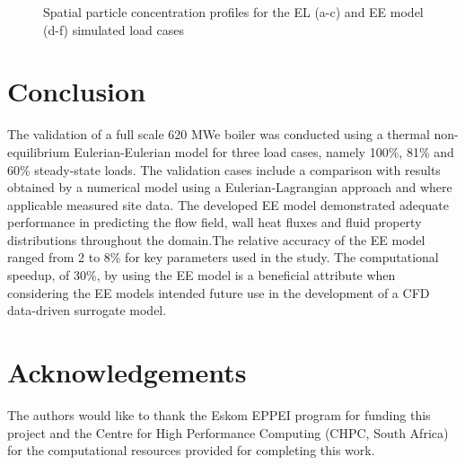 \documentclass{webofc}
\begin{document}
\begin{figure}[h!]
\setlength{\belowcaptionskip}{0pt} 
\caption{Spatial particle concentration profiles for the EL (a-c) and EE model (d-f) simulated load cases}
\label{fig_concentration}
\end{figure}

\clearpage
\section{Conclusion}
The validation of a full scale 620 MWe boiler was conducted using a thermal non-equilibrium Eulerian-Eulerian model for three load cases, namely 100\%, 81\% and 60\% steady-state loads. The validation cases include a comparison with results obtained by a numerical model using a Eulerian-Lagrangian approach and where applicable measured site data. The developed EE model demonstrated adequate performance in predicting the flow field, wall heat fluxes and fluid property distributions throughout the domain.The relative accuracy of the EE model ranged from 2 to 8\% for key parameters used in the study. The computational speedup, of 30\%, by using the EE model is a beneficial attribute when considering the EE models intended future use in the development of a CFD data-driven surrogate model. 

\section*{Acknowledgements}
The authors would like to thank the Eskom EPPEI program for funding this project and the Centre for High Performance Computing (CHPC, South Africa) for the computational resources provided for completing this work.

%
% 
%
%
\end{document}
